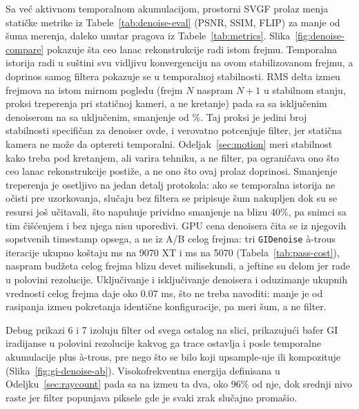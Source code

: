 Sa ve\'c aktivnom temporalnom akumulacijom, prostorni SVGF prolaz menja stati\v{c}ke metrike iz
Tabele~\ref{tab:denoise-eval}
(PSNR, SSIM, FLIP) za manje od \v{s}uma merenja, daleko unutar pragova iz
Tabele~\ref{tab:metrics}. Slika~\ref{fig:denoise-compare} pokazuje \v{s}ta ceo lanac rekonstrukcije
radi istom frejmu. Temporalna istorija radi u su\v{s}tini svu
vidljivu konvergenciju na ovom stabilizovanom frejmu, a doprinos samog filtera pokazuje se u temporalnoj
stabilnosti. RMS delta izme\dj{}u frejmova na istom mirnom pogledu (frejm $N$ naspram $N{+}1$ u
stabilnom stanju, proksi treperenja pri statičnoj kameri, a ne kretanje) pada sa \flickerOff{} sa
isklju\v{c}enim denoiserom na \flickerOn{} sa uklju\v{c}enim, smanjenje od \flickerPct\%. Taj proksi je jedini
broj stabilnosti specifi\v{c}an za denoiser ovde, i verovatno potcenjuje filter, jer stati\v{c}na kamera
ne mo\v{z}e da optereti temporalni. Odeljak~\ref{sec:motion} meri stabilnost kako treba pod kretanjem,
ali varira tehniku, a ne filter, pa ograni\v{c}ava ono \v{s}to ceo lanac rekonstrukcije
posti\v{z}e, a ne ono \v{s}to ovaj prolaz doprinosi. Smanjenje treperenja je osetljivo na
jedan detalj protokola: ako se temporalna istorija ne o\v{c}isti pre uzorkovanja, slu\v{c}aju bez filtera
se pripisuje \v{s}um nakupljen dok su se resursi jo\v{s} u\v{c}itavali, \v{s}to napuhuje prividno
smanjenje na blizu 40\%, pa snimci sa tim \v{c}i\v{s}\'cenjem i bez njega nisu uporedivi. GPU cena
denoisera \v{c}ita se iz njegovih sopstvenih timestamp opsega, a ne iz A/B celog frejma: tri
\texttt{GIDenoise} à-trous iteracije ukupno ko\v{s}taju \perfDenoiseAMD{} ms na 9070 XT i
\perfDenoiseNV{} ms na 5070 (Tabela~\ref{tab:pass-cost}), naspram bud\v{z}eta celog frejma blizu devet
milisekundi, a jeftine su delom jer rade u polovini rezolucije. Uklju\v{c}ivanje i isklju\v{c}ivanje denoisera
i oduzimanje ukupnih vrednosti celog frejma daje oko 0.07 ms, \v{s}to ne treba navoditi: manje je od
rasipanja izme\dj{}u pokretanja identi\v{c}ne konfiguracije, pa meri \v{s}um, a ne filter.

Debug prikazi 6 i 7 izoluju filter od svega ostalog na slici, prikazuju\'ci bafer GI iradijanse u polovini
rezolucije kakvog ga trace ostavlja i posle temporalne akumulacije plus à-trous, pre nego \v{s}to se
bilo koji upsample-uje ili kompozituje (Slika~\ref{fig:gi-denoise-ab}). Visokofrekventna energija definisana
u Odeljku~\ref{sec:raycount} pada sa \hfGiRaw{} na \hfGiDenoised{} izme\dj{}u ta dva, oko 96\% od
nje, dok srednji nivo raste jer filter popunjava piksele gde je svaki zrak slu\v{c}ajno
promašio.


